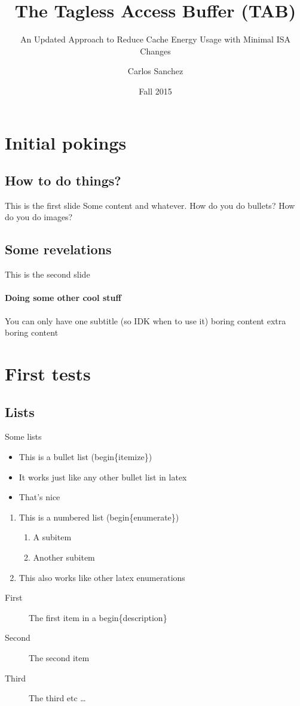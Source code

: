 \documentclass{beamer}
\title[TAB v2] %
{The Tagless Access Buffer (TAB)}
\subtitle{An Updated Approach to Reduce Cache Energy Usage with Minimal ISA Changes}
\author{Carlos Sanchez}
\institute[FSU]
{Computer Science Department\\ Florida State University}
\date{Fall 2015}
\begin{document}
 
\frame{\titlepage} 
\section{Initial pokings}
\subsection{How to do things?}
\begin{frame}{This is the first slide}
   Some content and whatever.
   How do you do bullets?
   How do you do images?
\end{frame}
\subsection{Some revelations}
\begin{frame}{This is the second slide}
   \framesubtitle{Doing some other cool stuff}
   You can only have one subtitle (so IDK when to use it)
   boring content
   extra boring content
\end{frame}
\section{First tests}
\subsection{Lists}
\begin{frame}{Some lists}
   \begin{itemize}
      \item This is a bullet list (begin\{itemize\})
      \item It works just like any other bullet list in latex
      \item That's nice
   \end{itemize}
   \begin{enumerate}
      \item This is a numbered list (begin\{enumerate\})
         \begin{enumerate}
            \item A subitem
            \item Another subitem
         \end{enumerate}
      \item This also works like other latex enumerations
   \end{enumerate}
   \begin{description}
      \item[First] The first item in a begin\{description\}
      \item[Second] The second item
      \item[Third] The third etc \ldots
   \end{description}
\end{frame}
\end{document}
